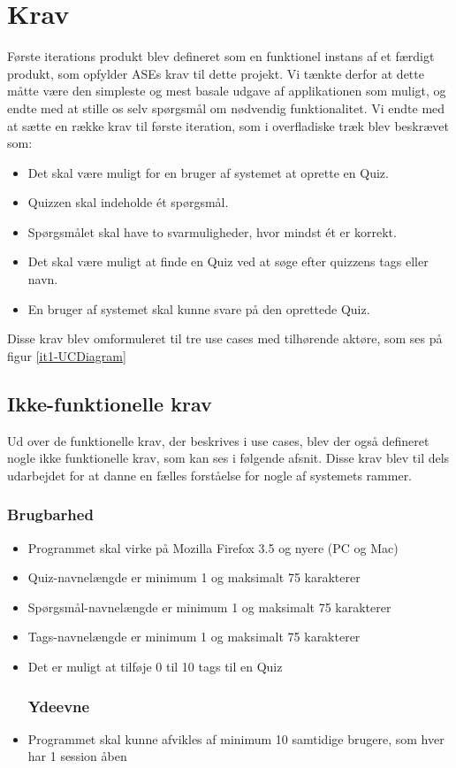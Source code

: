 \section{Krav}
Første iterations produkt blev defineret som en funktionel instans af et færdigt produkt, som opfylder ASEs krav til dette projekt. Vi tænkte derfor at dette måtte være den simpleste og mest basale udgave af applikationen som muligt, og endte med at stille os selv spørgsmål om nødvendig funktionalitet.
Vi endte med at sætte en række krav til første iteration, som i overfladiske træk blev beskrævet som:
\begin{itemize}
	\item Det skal være muligt for en bruger af systemet at oprette en Quiz.
	\item Quizzen skal indeholde ét spørgsmål.
	\item Spørgsmålet skal have to svarmuligheder, hvor mindst ét er korrekt.
	\item Det skal være muligt at finde en Quiz ved at søge efter quizzens tags eller navn.
	\item En bruger af systemet skal kunne svare på den oprettede Quiz.
\end{itemize}

Disse krav blev omformuleret til tre use cases med tilhørende aktøre, som ses på figur \ref{it1-UCDiagram}


\subsection*{Ikke-funktionelle krav}
Ud over de funktionelle krav, der beskrives i use cases, blev der også defineret nogle ikke funktionelle krav, som kan ses i følgende afsnit. Disse krav blev til dels udarbejdet for at danne en fælles forståelse for nogle af systemets rammer.

\subsubsection*{Brugbarhed}
\begin{itemize}
	\item Programmet skal virke på Mozilla Firefox 3.5 og nyere (PC og Mac)
	\item Quiz-navnelængde er minimum 1 og maksimalt 75 karakterer
	\item Spørgsmål-navnelængde er minimum 1 og maksimalt 75 karakterer
	\item Tags-navnelængde er minimum 1 og maksimalt 75 karakterer
	\item Det er muligt at tilføje 0 til 10 tags til en Quiz

\subsubsection*{Ydeevne}
	\item Programmet skal kunne afvikles af minimum 10 samtidige brugere, som hver har 1 session åben

\end{itemize}